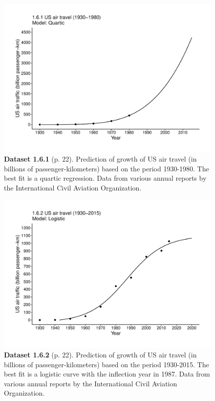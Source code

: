 \documentclass[aps,rmp,preprint,superscriptaddress,10pt,onecolumn]{article}
\begin{document}
\clearpage
\begin{figure}[h]
\includegraphics[width=\textwidth]{output/figs-ggplot/1.6.1.pdf}
\caption*{\textbf{Dataset 1.6.1} (p. 22). Prediction of growth of US air travel (in billions of passenger-kilometers) based on the period 1930-1980. The best fit is a quartic regression. Data from various annual reports by the International Civil Aviation Organization. }
\end{figure}
	
\clearpage
\begin{figure}[h]
\includegraphics[width=\textwidth]{output/figs-ggplot/1.6.2.pdf}
\caption*{\textbf{Dataset 1.6.2} (p. 22). Prediction of growth of US air travel (in billions of passenger-kilometers) based on the period 1930-2015. The best fit is a logistic curve with the inflection year in 1987. Data from various annual reports by the International Civil Aviation Organization. }
\end{figure}
	
\end{document}
